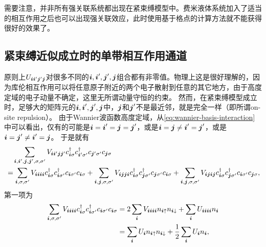 需要注意，并非所有强关联系统都出现在紧束缚模型中。费米液体系统加入了适当的相互作用之后也可以出现强关联效应，此时使用基于格点的计算方法就不能获得很好的效果了。

\subsection{紧束缚近似成立时的单带相互作用通道}\label{sec:single-band-interaction-channel}

原则上$U_{\vb*{i} \vb*{i}' \vb*{j}' \vb*{j}}$对很多不同的$\vb*{i}, \vb*{i}', \vb*{j}', \vb*{j}$组合都有非零值。物理上这是很好理解的，因为库伦相互作用可以将任意原子附近的两个电子散射到任意的其它地方，由于高度定域的电子动量不确定，这里无所谓动量守恒的约束。
然而，在紧束缚模型成立时，足够大的矩阵元的$\vb*{i}, \vb*{i}', \vb*{j}', \vb*{j}$中，$\vb*{j}$和$\vb*{j}'$不是最近邻，就是完全一样（即所谓on-site repulsion）。
由于Wannier波函数高度定域，从\eqref{eq:wannier-basis-interaction}中可以看出，仅有的可能是$\vb*{i}=\vb*{i}'=\vb*{j}=\vb*{j}'$，或是$\vb*{i}=\vb*{j} \neq \vb*{i}'=\vb*{j}'$，或是$\vb*{i}=\vb*{j}' \neq \vb*{i}' = \vb*{j}$。
于是就有
\[
    \begin{aligned}
        &\quad \sum_{\vb*{i}, \vb*{i}', \vb*{j}, \vb*{j}', \sigma, \sigma'} V_{\vb*{i} \vb*{i}' \vb*{j} \vb*{j}'} c^\dagger_{\vb*{i} \sigma} c^\dagger_{\vb*{i}' \sigma'} c_{\vb*{j}' \sigma'} c_{\vb*{j} \sigma} \\
        &= \sum_{\vb*{i}, \sigma, \sigma'} V_{\vb*{i} \vb*{i} \vb*{i} \vb*{i}} c^\dagger_{\vb*{i} \sigma} c^\dagger_{\vb*{i} \sigma'} c_{\vb*{i} \sigma'} c_{\vb*{i} \sigma} 
        + \sum_{\vb*{i}, \vb*{j}, \sigma, \sigma'} V_{\vb*{i} \vb*{j} \vb*{j} \vb*{i}} c^\dagger_{\vb*{i} \sigma} c^\dagger_{\vb*{j} \sigma'} c_{\vb*{j} \sigma'} c_{\vb*{i} \sigma}
        + \sum_{\vb*{i}, \vb*{j}, \sigma, \sigma'} V_{\vb*{i} \vb*{j} \vb*{i} \vb*{j}} c^\dagger_{\vb*{i} \sigma} c^\dagger_{\vb*{j} \sigma'} c_{\vb*{i} \sigma'} c_{\vb*{j} \sigma},
    \end{aligned}
\]
第一项为
\[
    \begin{aligned}
        \sum_{\vb*{i}, \sigma, \sigma'} V_{\vb*{i} \vb*{i} \vb*{i} \vb*{i}} c^\dagger_{\vb*{i} \sigma} c^\dagger_{\vb*{i} \sigma'} c_{\vb*{i} \sigma'} c_{\vb*{i} \sigma} &= 2 \sum_{\vb*{i}} V_{\vb*{i} \vb*{i} \vb*{i} \vb*{i}} n_{\vb*{i} \uparrow} n_{\vb*{i} \downarrow} + \sum_{\vb*{i}} U_{\vb*{i} \vb*{i} \vb*{i} \vb*{i}} n_{\vb*{i}} \\
        &= \sum_{\vb*{i}} U_{\vb*{i}} n_{\vb*{i} \uparrow} n_{\vb*{i} \downarrow} + \frac{1}{2} \sum_{\vb*{i}} U_{\vb*{i}} n_{\vb*{i}},
    \end{aligned}
\]
